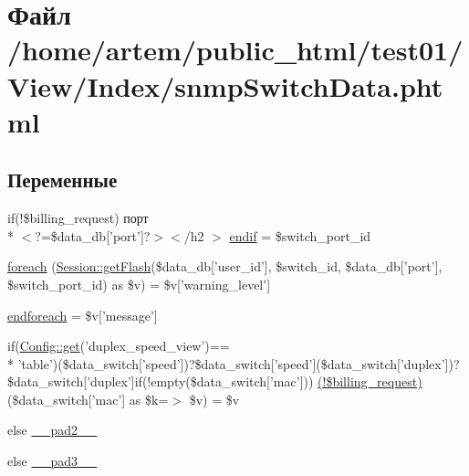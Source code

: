 \hypertarget{snmp_switch_data_8phtml}{\section{Файл /home/artem/public\-\_\-html/test01/\-View/\-Index/snmp\-Switch\-Data.phtml}
\label{snmp_switch_data_8phtml}
}
\subsection*{Переменные}
\begin{DoxyCompactItemize}
\item 
if(!\$billing\-\_\-request) порт\\*
$<$?=\$data\-\_\-db\mbox{[}'port'\mbox{]}?$>$$<$/h2 $>$ \hyperlink{snmp_switch_data_8phtml_ad46029792e22c84c23775487f5df39df}{endif} = \$switch\-\_\-port\-\_\-id
\item 
\hyperlink{snmp_switch_data_8phtml_a1aebcd3bfc8b09c505928fe2958e6143}{foreach} (\hyperlink{class_session_ae4c4b98671bdd1fbfe4ae9defb5405ad}{Session\-::get\-Flash}(\$data\-\_\-db\mbox{[}'user\-\_\-id'\mbox{]}, \$switch\-\_\-id, \$data\-\_\-db\mbox{[}'port'\mbox{]}, \$switch\-\_\-port\-\_\-id) as \$v) = \$v\mbox{[}'warning\-\_\-level'\mbox{]}
\item 
\hyperlink{snmp_switch_data_8phtml_a672d9707ef91db026c210f98cc601123}{endforeach} = \$v\mbox{[}'message'\mbox{]}
\item 
if(\hyperlink{class_config_a15e2679f2a8f6fa4d60757f4d65413ac}{Config\-::get}('duplex\-\_\-speed\-\_\-view')== \\*
'table')(\$data\-\_\-switch\mbox{[}'speed'\mbox{]})?\$data\-\_\-switch\mbox{[}'speed'\mbox{]}(\$data\-\_\-switch\mbox{[}'duplex'\mbox{]})?\$data\-\_\-switch\mbox{[}'duplex'\mbox{]}if(!empty(\$data\-\_\-switch\mbox{[}'mac'\mbox{]})) \hyperlink{snmp_switch_data_8phtml_acdc3d14aaf4fe531149c8ceaea738f59}{(!\$billing\-\_\-request)} (\$data\-\_\-switch\mbox{[}'mac'\mbox{]} as \$k=$>$ \$v) = \$v
\item 
else \hyperlink{snmp_switch_data_8phtml_aed2d37b4e8da3f52103ae96ce9d26d82}{\-\_\-\-\_\-pad2\-\_\-\-\_\-}
\item 
else \hyperlink{snmp_switch_data_8phtml_ad3aa1069376b85bd4e503b216d54b18d}{\-\_\-\-\_\-pad3\-\_\-\-\_\-}
\end{DoxyCompactItemize}


